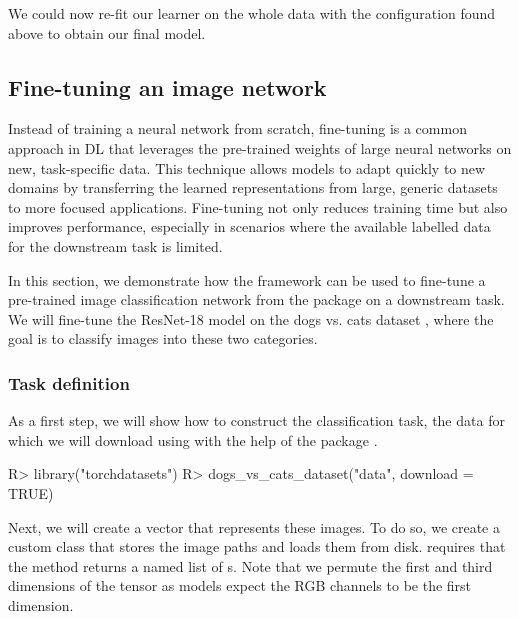 \documentclass[article]{jss}
\theoremstyle{definition}
\begin{document}
We could now re-fit our learner on the whole data with the configuration found above to obtain our final model.

\subsection{Fine-tuning an image network}\label{sec:finetuning}

Instead of training a neural network from scratch, fine-tuning is a common approach in DL that leverages the pre-trained weights of large neural networks on new, task-specific data.
This technique allows models to adapt quickly to new domains by transferring the learned representations from large, generic datasets to more focused applications.
Fine-tuning not only reduces training time but also improves performance, especially in scenarios where the available labelled data for the downstream task is limited.

In this section, we demonstrate how the  framework can be used to fine-tune a pre-trained image classification network from the  package on a downstream task.
We will fine-tune the ResNet-18 model \citep{ref-he2015deepresiduallearningimage} on the dogs vs. cats dataset \citep{ref-dogs-vs-cats2013}, where the goal is to classify images into these two categories.

\subsubsection{Task definition}

As a first step, we will show how to construct the classification task, the data for which we will download using with the help of the  \rlang{} package \citep{torchdatasets}.

\begin{CodeInput}
R> library("torchdatasets")
R> dogs_vs_cats_dataset("data", download = TRUE)
\end{CodeInput}

Next, we will create a  vector that represents these images.
To do so, we create a custom  class that stores the image paths and loads them from disk.
 requires that the  method returns a named list of s.
Note that we permute the first and third dimensions of the tensor as  models expect the RGB channels to be the first dimension.
\end{document}
